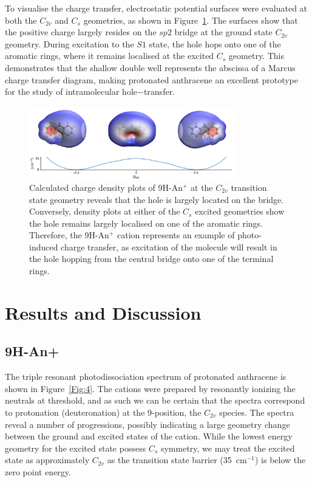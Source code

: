 \documentclass[journal=jpcafh,manuscript=article,layout=onecolumn, 12pt]{achemso}
\begin{document}
To visualise the charge transfer, electrostatic potential surfaces were evaluated at both the $C_{2v}$ and $C_s$ geometries, as shown in Figure~\ref{Fig:3}. The surfaces show that the positive charge largely resides on the $sp2$ bridge at the ground state $C_{2v}$ geometry. During excitation to the $S1$ state, the hole hops onto one of the aromatic rings, where it remains localised at the excited $C_s$ geometry. This demonstrates that the shallow double well represents the abscissa of a Marcus charge transfer diagram, making protonated anthracene an excellent prototype for the study of intramolecular hole$-$transfer.

\begin{figure} [h]
	\includegraphics[width=0.8\textwidth]{figures/Figure3W}
	\caption{Calculated charge density plots of 9H-An$^+$ at the $C_{2v}$ transition state geometry reveals that the hole is largely located on the bridge. Conversely, density plots at either of the $C_s$ excited geometries show the hole remains largely localised on one of the aromatic rings. Therefore, the 9H-An$^+$ cation represents an example of photo-induced charge transfer, as excitation of the molecule will result in the hole hopping from the central bridge onto one of the terminal rings.}
	\label{Fig:3}
\end{figure}

\section{Results and Discussion}
\subsection{9H-An+}
The triple resonant photodissociation spectrum of protonated anthracene is shown in Figure~\ref{Fig:4}. The cations were prepared by resonantly ionizing the neutrals at threshold, and as such we can be certain that the spectra correspond to protonation (deuteronation) at the 9-position, the $C_{2v}$ species. The spectra reveal a number of progressions, possibly indicating a large geometry change between the ground and excited states of the cation. While the lowest energy geometry for the excited state possess $C_s$ symmetry, we may treat the excited state as approximately $C_{2v}$ as the transition state barrier (35~cm$^{-1}$) is below the zero point energy.  
\end{document}
